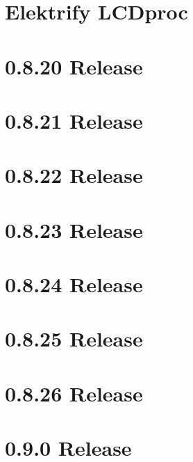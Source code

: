 \documentclass[twoside]{book}
\newcommand{\+}{\discretionary{\mbox{\scriptsize$\hookleftarrow$}}{}{}}
\begin{document}
\chapter{Elektrify L\+C\+Dproc}
\label{doc_news_2017-03-18_lcdproc_md}

\chapter{0.8.20 Release}
\label{doc_news_2017-10-31_0_8_20_md}

\chapter{0.8.21 Release}
\label{doc_news_2017-12-22_0_8_21_md}

\chapter{0.8.22 Release}
\label{doc_news_2018-03-27_0_8_22_md}

\chapter{0.8.23 Release}
\label{doc_news_2018-05-13_0_8_23_md}

\chapter{0.8.24 Release}
\label{doc_news_2018-08-18_0_8_24_md}

\chapter{0.8.25 Release}
\label{doc_news_2018-11-18_0_8_25_md}

\chapter{0.8.26 Release}
\label{doc_news_2019-02-26_0_8_26_md}

\chapter{0.9.0 Release}
\label{doc_news_2019-08-06_0_9_0_md}

\end{document}
